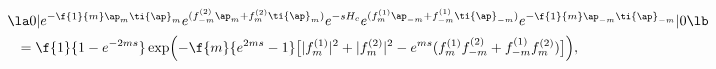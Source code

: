 \begin{equation}
\begin{split}
&\la 0|e^{-\f{1}{m}\ap_{m}\ti{\ap}_{m}}
e^{(f^{(2)}_{-m}\ap_{m}+f^{(2)}_m\ti{\ap}_{m})}
e^{-sH_{c}}
e^{(f^{(1)}_{m}\ap_{-m}+f^{(1)}_{-m}\ti{\ap}_{-m})}
e^{-\f{1}{m}\ap_{-m}\ti{\ap}_{-m}}|0\lb\\
&\ \ =\f{1}{1-e^{-2ms}}
\exp\Bigl(-\f{m}{e^{2ms}-1}\bigl[|f^{(1)}_{m}|^2+|f^{(2)}_{m}|^2
-e^{ms}(f^{(1)}_{m}f^{(2)}_{-m}+f^{(1)}_{-m}f^{(2)}_{m})\bigr]\Bigr)
\label{BHCg},
\end{split}
\end{equation} 
